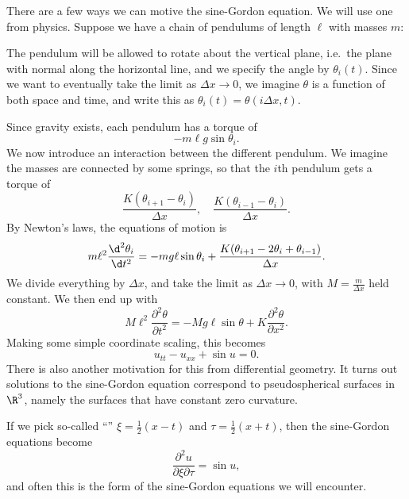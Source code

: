 \documentclass[a4paper]{article}
\begin{document}
There are a few ways we can motive the sine-Gordon equation. We will use one from physics. Suppose we have a chain of pendulums of length $\ell$ with masses $m$:
\begin{center}
\end{center}
The pendulum will be allowed to rotate about the vertical plane, i.e.\ the plane with normal along the horizontal line, and we specify the angle by $\theta_i(t)$. Since we want to eventually take the limit as $\Delta x \to 0$, we imagine $\theta$ is a function of both space and time, and write this as $\theta_i(t) = \theta(i \Delta x, t)$.

Since gravity exists, each pendulum has a torque of
\[
  -m\ell g \sin \theta_i.
\]
We now introduce an interaction between the different pendulum. We imagine the masses are connected by some springs, so that the $i$th pendulum gets a torque of
\[
  \frac{K(\theta_{i + 1} - \theta_i)}{\Delta x},\quad \frac{K(\theta_{i - 1} - \theta_i)}{\Delta x}.
\]
By Newton's laws, the equations of motion is
\[
  m\ell^2 \frac{\d^2 \theta_i}{\d t^2} = -mg \ell \sin \theta_i + \frac{K(\theta_{i + 1} - 2 \theta_i + \theta_{i - 1})}{\Delta x}.
\]
We divide everything by $\Delta x$, and take the limit as $\Delta x \to 0$, with $M = \frac{m}{\Delta x}$ held constant. We then end up with
\[
  M \ell^2 \frac{\partial^2 \theta}{\partial t^2} = - Mg\ell \sin \theta + K \frac{\partial^2 \theta}{\partial x^2}.
\]
Making some simple coordinate scaling, this becomes
\[
  u_{tt} - u_{xx} + \sin u = 0.
\]
There is also another motivation for this from differential geometry. It turns out solutions to the sine-Gordon equation correspond to pseudospherical surfaces in $\R^3$, namely the surfaces that have constant zero curvature.

If we pick so-called ``'' $\xi = \frac{1}{2}(x - t)$ and $\tau = \frac{1}{2}(x + t)$, then the sine-Gordon equations become
\[
  \frac{\partial^2 u}{\partial \xi \partial\tau} = \sin u,
\]
and often this is the form of the sine-Gordon equations we will encounter.
\end{document}
